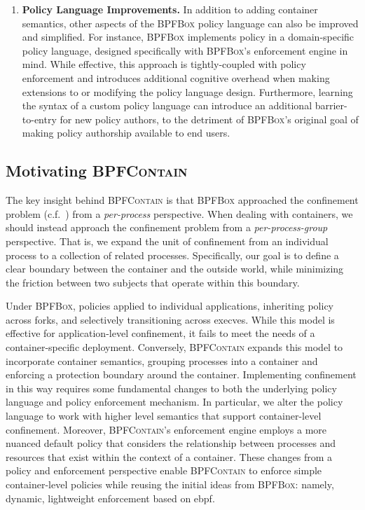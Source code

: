 \documentclass[
  fontsize=12pt,
  titlepage=firstiscover,
  paper=letter,
oneside,
  cleardoublepage=plain,
  parskip=half-,
  DIV=10,
  parindent,
  appendixprefix,
  chapterprefix,
  listof=totoc,
]{scrbook}
\newcommand{\bpfbox}{\textsc{BPFBox}}
\newcommand{\bpfcontain}{\textsc{BPFContain}}
\begin{document}
\begin{enumerate}
  \item \textbf{Policy Language Improvements.}
    In addition to adding container semantics, other aspects of the \bpfbox{} policy
    language can also be improved and simplified. For instance, \bpfbox{} implements
    policy in a domain-specific policy language, designed specifically with \bpfbox{}'s
    enforcement engine in mind. While effective, this approach is tightly-coupled with
    policy enforcement and introduces additional cognitive overhead when making extensions
    to or modifying the policy language design. Furthermore, learning the syntax of
    a custom policy language can introduce an additional barrier-to-entry for new policy
    authors, to the detriment of \bpfbox{}'s original goal of making policy authorship
    available to end users.
\end{enumerate}

\subsection{Motivating \bpfcontain{}}

The key insight behind \bpfcontain{} is that \bpfbox{} approached the confinement problem
(c.f.\ ) from a \textit{per-process} perspective. When dealing
with containers, we should instead approach the confinement problem from
a \textit{per-process-group} perspective. That is, we expand the unit of confinement from
an individual process to a collection of related processes. Specifically, our goal is to
define a clear boundary between the container and the outside world, while minimizing the
friction between two subjects that operate within this boundary.

Under \bpfbox{}, policies applied to individual applications, inheriting policy across
forks, and selectively transitioning across execves. While this model is effective for
application-level confinement, it fails to meet the needs of a container-specific
deployment.  Conversely, \bpfcontain{} expands this model to incorporate container
semantics, grouping processes into a container and enforcing a protection boundary around
the container.  Implementing confinement in this way requires some fundamental changes to
both the underlying policy language and policy enforcement mechanism. In particular, we
alter the policy language to work with higher level semantics that support container-level
confinement. Moreover, \bpfcontain{}'s enforcement engine employs a more nuanced default
policy that considers the relationship between processes and resources that exist within
the context of a container. These changes from a policy and enforcement perspective enable
\bpfcontain{} to enforce simple container-level policies while reusing the initial ideas
from \bpfbox{}: namely, dynamic, lightweight enforcement based on \gls{ebpf}.
\end{document}
